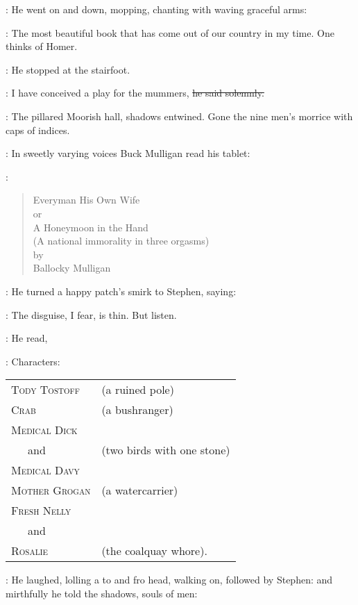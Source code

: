 :
He went on and down,
mopping,
chanting with waving graceful arms:

\mulligan:
The most beautiful book that has come out of our country in my time.
One thinks of Homer.

:
He stopped at the stairfoot.

\mulligan:
I have conceived a play for the mummers,
\sout{he said solemnly.}

:
The pillared Moorish hall,
shadows entwined.
Gone the nine men's morrice with caps of indices.

:
In sweetly varying voices
Buck Mulligan read his tablet:

\mulligan:
\begin{verse}
        Everyman His Own Wife \\
                or \\
        A Honeymoon in the Hand \\
    (A national immorality in three orgasms) \\
                by \\
        Ballocky Mulligan
    \end{verse}

:
He turned a happy patch's smirk to Stephen,
saying:

\mulligan:
The disguise,
I fear,
is thin.
But listen.

:
He read,

\mulligan:
Characters:
 \\
\begin{tabular}{lp{10cm}}
    \textsc{Tody Tostoff}    & (a ruined pole) \\
    \textsc{Crab}            & (a bushranger) \\
    \textsc{Medical Dick}    & \\
        \ \ \ and            & (two birds with one stone) \\
    \textsc{Medical Davy}    & \\
    \textsc{Mother Grogan}   & (a watercarrier) \\
    \textsc{Fresh Nelly} \\
        \ \ \ and \\
    \textsc{Rosalie}        & (the coalquay whore).
\end{tabular}

:
He laughed,
lolling a to and fro head,
walking on,
followed by Stephen:
and mirthfully he told the shadows,
souls of men:


